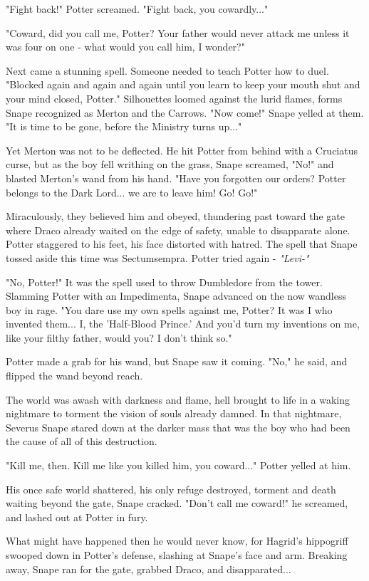 \documentclass[a4paper,11pt]{article}
\begin{document}
"Fight back!" Potter screamed. "Fight back, you cowardly..."

"Coward, did you call me, Potter? Your father would never attack me unless it was four on one - what would you call him, I wonder?"

Next came a stunning spell. Someone needed to teach Potter how to duel. "Blocked again and again and again until you learn to keep your mouth shut and your mind closed, Potter." Silhouettes loomed against the lurid flames, forms Snape recognized as Merton and the Carrows. "Now come!" Snape yelled at them. "It is time to be gone, before the Ministry turns up..."

Yet Merton was not to be deflected. He hit Potter from behind with a Cruciatus curse, but as the boy fell writhing on the grass, Snape screamed, "No!" and blasted Merton's wand from his hand. "Have you forgotten our orders? Potter belongs to the Dark Lord... we are to leave him! Go! Go!"

Miraculously, they believed him and obeyed, thundering past toward the gate where Draco already waited on the edge of safety, unable to disapparate alone. Potter staggered to his feet, his face distorted with hatred. The spell that Snape tossed aside this time was Sectumsempra. Potter tried again - \emph{"Levi-"}

"No, Potter!" It was the spell used to throw Dumbledore from the tower. Slamming Potter with an Impedimenta, Snape advanced on the now wandless boy in rage. "You dare use my own spells against me, Potter? It was I who invented them... I, the 'Half-Blood Prince.' And you'd turn my inventions on me, like your filthy father, would you? I don't think so."

Potter made a grab for his wand, but Snape saw it coming. "No," he said, and flipped the wand beyond reach.

The world was awash with darkness and flame, hell brought to life in a waking nightmare to torment the vision of souls already damned. In that nightmare, Severus Snape stared down at the darker mass that was the boy who had been the cause of all of this destruction.

"Kill me, then. Kill me like you killed him, you coward..." Potter yelled at him.

His once safe world shattered, his only refuge destroyed, torment and death waiting beyond the gate, Snape cracked. "Don't call me coward!" he screamed, and lashed out at Potter in fury.

What might have happened then he would never know, for Hagrid's hippogriff swooped down in Potter's defense, slashing at Snape's face and arm. Breaking away, Snape ran for the gate, grabbed Draco, and disapparated...
\end{document}
